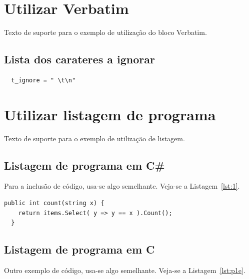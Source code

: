 \section{Utilizar Verbatim}
Texto de suporte para o exemplo de utilização do bloco Verbatim.

\subsection{Lista dos carateres a ignorar}
\begin{Verbatim}
  t_ignore = " \t\n"
\end{Verbatim}
\hfill \break

\section{Utilizar listagem de programa}
Texto de suporte para o exemplo de utilização de listagem.

\subsection{Listagem de programa em C\#}
Para a inclusão de código, usa-se algo semelhante. Veja-se a Listagem~\ref{lst:1}.

\begin{lstlisting}[language={[sharp]c},
caption={Método para contar o número de elementos numa lista iguais a uma determinada string.},
label=lst:1]
  public int count(string x) {
    return items.Select( y => y == x ).Count();
  }
\end{lstlisting}

\subsection{Listagem de programa em C}
Outro exemplo de código, usa-se algo semelhante. Veja-se a Listagem~\ref{lst:p1e}.

